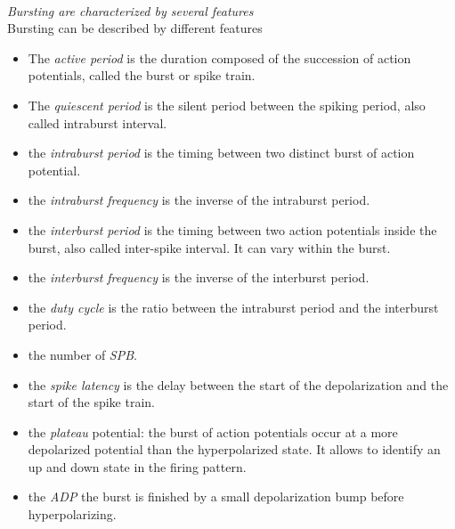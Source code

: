 ~\\
\textit{Bursting are characterized by several features}\\
Bursting can be described by different features \citep{van_pottelbergh_robust_2018, drion_novel_2012} 
\begin{itemize}
    \item The \textit{active period} is the duration composed of the succession of action potentials, called the burst or spike train. 
    \item The \textit{quiescent period} is the silent period between the spiking period, also called intraburst interval.
    \item the \textit{intraburst period} is the timing between two distinct burst of action potential. 
    \item the \textit{intraburst frequency} is the inverse of the intraburst period. 
    \item the \textit{interburst period} is the timing between two action potentials inside the burst, also called inter-spike interval. It can vary within the burst. 
    \item the \textit{interburst frequency} is the inverse of the interburst period. 
    \item the \textit{duty cycle} is the ratio between the intraburst period and the interburst period. 
    \item the number of \textit{\acrfull{SPB}}.
    \item the \textit{spike latency} is the delay between the start of the depolarization and the start of the spike train.
    \item the \textit{plateau} potential: the burst of action potentials occur at a more depolarized potential than the hyperpolarized state. It allows to identify an up and down state in the firing pattern. 
    \item the \textit{\acrfull{ADP}} the burst is finished by a small depolarization bump before hyperpolarizing.
\end{itemize}



